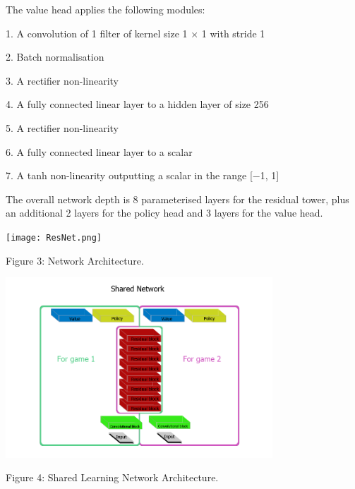 \documentclass[12pt,a4paper]{report}
\begin{document}
The value head applies the following modules:\par
1. A convolution of 1 filter of kernel size 1 × 1 with stride 1\par
2. Batch normalisation\par
3. A rectifier non-linearity\par
4. A fully connected linear layer to a hidden layer of size 256\par
5. A rectifier non-linearity\par
6. A fully connected linear layer to a scalar\par
7. A tanh non-linearity outputting a scalar in the range [−1, 1]\par
The overall network depth is 8 parameterised layers for the residual tower, plus an additional 2 layers for the policy head and 3 layers for the value head.
\begin{center}
\texttt{[image: ResNet.png]}\par
\begin{small}
Figure 3: Network Architecture.\par
\end{small}
\end{center}
\begin{center}
\includegraphics[width=0.75\textwidth]{SharedNet.png}\par
\begin{small}
Figure 4: Shared Learning Network Architecture.\par
\end{small}
\end{center}
\clearpage
\end{document}
